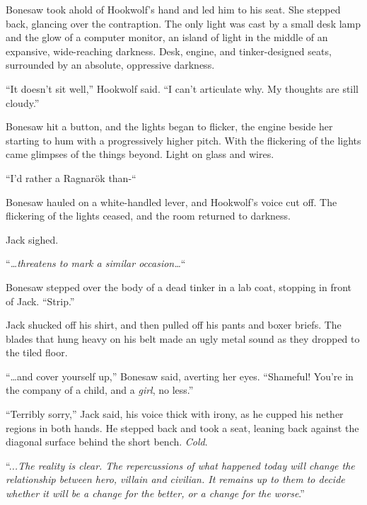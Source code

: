 Bonesaw took ahold of Hookwolf's hand and led him to his seat.  She stepped back, glancing over the contraption.  The only light was cast by a small desk lamp and the glow of a computer monitor, an island of light in the middle of an expansive, wide-reaching darkness.  Desk, engine, and tinker-designed seats, surrounded by an absolute, oppressive darkness.



``It doesn't sit well,'' Hookwolf said.  ``I can't articulate why.  My thoughts are still cloudy.''



Bonesaw hit a button, and the lights began to flicker, the engine beside her starting to hum with a progressively higher pitch.  With the flickering of the lights came glimpses of the things beyond.  Light on glass and wires.



``I'd rather a Ragnar\"{o}k than-``



Bonesaw hauled on a white-handled lever, and Hookwolf's voice cut off.  The flickering of the lights ceased, and the room returned to darkness.



Jack sighed.



``\emph{\ldots{}threatens to mark a similar occasion\ldots}``



Bonesaw stepped over the body of a dead tinker in a lab coat, stopping in front of Jack.  ``Strip.''



Jack shucked off his shirt, and then pulled off his pants and boxer briefs.  The blades that hung heavy on his belt made an ugly metal sound as they dropped to the tiled floor.



``\ldots{}and cover yourself up,'' Bonesaw said, averting her eyes.  ``Shameful!  You're in the company of a child, and a \emph{girl}, no less.''



``Terribly sorry,'' Jack said, his voice thick with irony, as he cupped his nether regions in both hands.  He stepped back and took a seat, leaning back against the diagonal surface behind the short bench.  \emph{Cold}.



``.\emph{..The reality is clear.  The repercussions of what happened today will change the relationship between hero, villain and civilian.  It remains up to them to decide whether it will be a change for the better, or a change for the worse}.''




